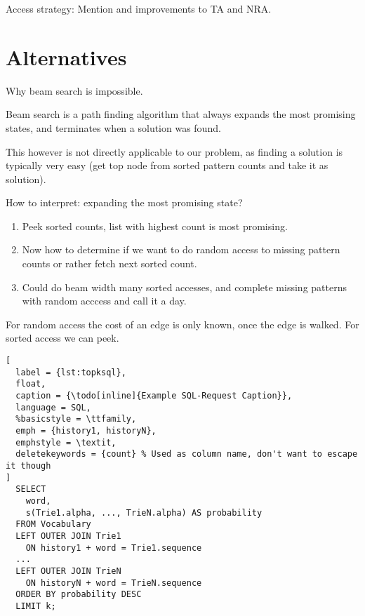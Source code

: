 \begin{draft}
Access strategy:
Mention \textcite{Guentzer2000} and \textcite{Guentzer2001} improvements to TA
and NRA.
\end{draft}

\section{Alternatives}

\begin{draft}
Why beam search is impossible.

Beam search is a path finding algorithm that always expands the most promising
states, and terminates when a solution was found.

This however is not directly applicable to our problem, as finding a solution
is typically very easy (get top node from sorted pattern counts and take it as
solution).

How to interpret: expanding the most promising state?
\begin{enumerate}
  \item Peek sorted counts, list with highest count is most promising.
  \item Now how to determine if we want to do random access to missing pattern
    counts or rather fetch next sorted count.
  \item Could do beam width many sorted accesses, and complete missing patterns
    with random acccess and call it a day.
\end{enumerate}

For random access the cost of an edge is only known, once the edge is walked.
For sorted access we can peek.
\end{draft}

\begin{lstlisting}[
  label = {lst:topksql},
  float,
  caption = {\todo[inline]{Example SQL-Request Caption}},
  language = SQL,
  %basicstyle = \ttfamily,
  emph = {history1, historyN},
  emphstyle = \textit,
  deletekeywords = {count} % Used as column name, don't want to escape it though
]
  SELECT
    word,
    s(Trie1.alpha, ..., TrieN.alpha) AS probability
  FROM Vocabulary
  LEFT OUTER JOIN Trie1
    ON history1 + word = Trie1.sequence
  ...
  LEFT OUTER JOIN TrieN
    ON historyN + word = TrieN.sequence
  ORDER BY probability DESC
  LIMIT k;
\end{lstlisting}
